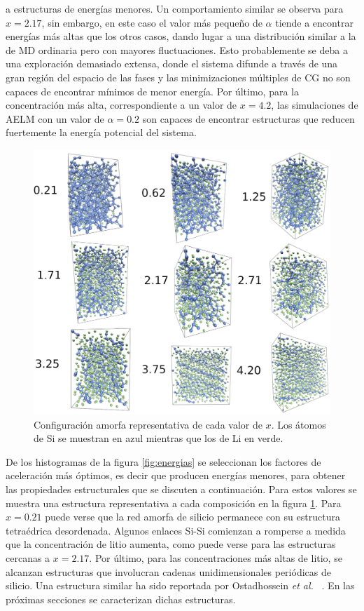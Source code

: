 a estructuras de energías menores. Un comportamiento similar se observa para 
$x = 2.17$, sin embargo, en este caso el valor más pequeño de $\alpha$ tiende a 
encontrar energías más altas que los otros casos, dando lugar a una distribución
similar a la de MD ordinaria pero con mayores fluctuaciones. Esto probablemente 
se deba a una exploración demasiado extensa, donde el sistema difunde a través
de una gran región del espacio de las fases y las minimizaciones múltiples de 
CG no son capaces de encontrar mínimos de menor energía. Por último, para la 
concentración más alta, correspondiente a un valor de $x = 4.2$, las simulaciones 
de AELM con un valor de $\alpha = 0.2$ son capaces de encontrar estructuras que 
reducen fuertemente la energía potencial del sistema. 

\begin{figure}[t]
    \centering
    \includegraphics[width=\textwidth]{caracterizacion/resultados/introduccion/amorfas.png}
    \caption{Configuración amorfa representativa de cada valor de $x$. Los átomos
    de Si se muestran en azul mientras que los de Li en verde.}
    \label{fig:amorfas}
\end{figure}
De los histogramas de la figura \ref{fig:energias} se seleccionan los factores 
de aceleración más óptimos, es decir que producen energías menores, para obtener
las propiedades estructurales que se discuten a continuación. Para estos valores
se muestra una estructura representativa a cada composición en la figura 
\ref{fig:amorfas}. Para $x = 0.21$ puede verse que la red amorfa de silicio
permanece con su estructura tetraédrica desordenada. Algunos enlaces Si-Si 
comienzan a romperse a medida que la concentración de litio aumenta, como puede
verse para las estructuras cercanas a $x = 2.17$. Por último, para las 
concentraciones más altas de litio, se alcanzan estructuras que involucran 
cadenas unidimensionales periódicas de silicio. Una estructura similar ha sido 
reportada por Ostadhossein \textit{et al.} ~\cite{ostadhossein2015}. En las 
próximas secciones se caracterizan dichas estructuras.
